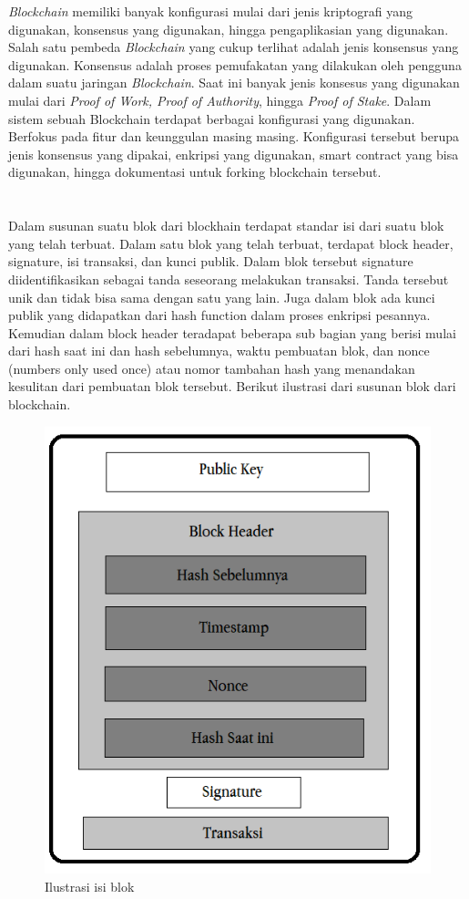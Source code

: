 \emph{Blockchain} memiliki banyak konfigurasi mulai dari jenis kriptografi yang digunakan, konsensus yang digunakan, hingga pengaplikasian yang digunakan. Salah satu pembeda \emph{Blockchain} yang cukup terlihat adalah jenis konsensus yang digunakan. Konsensus adalah proses pemufakatan yang dilakukan oleh pengguna dalam suatu jaringan \emph{Blockchain}. Saat ini banyak jenis konsesus yang digunakan mulai dari \emph{Proof of Work, Proof of Authority}, hingga \emph{Proof of Stake}. Dalam sistem sebuah Blockchain terdapat berbagai konfigurasi yang digunakan. Berfokus pada fitur dan keunggulan masing masing. Konfigurasi tersebut berupa jenis konsensus yang dipakai, enkripsi yang digunakan, smart contract yang bisa digunakan, hingga dokumentasi untuk forking blockchain tersebut.
\\ \\ \\
Dalam susunan suatu blok dari blockhain terdapat standar isi dari suatu blok yang telah terbuat. Dalam satu blok yang telah terbuat, terdapat block header, signature, isi transaksi, dan kunci publik. Dalam blok tersebut signature diidentifikasikan sebagai tanda seseorang melakukan transaksi. Tanda tersebut unik dan tidak bisa sama dengan satu yang lain. Juga dalam blok ada kunci publik yang didapatkan dari hash function dalam proses enkripsi pesannya. Kemudian dalam block header teradapat beberapa sub bagian yang berisi mulai dari hash saat ini dan hash sebelumnya, waktu pembuatan blok, dan nonce (numbers only used once) atau nomor tambahan hash yang menandakan kesulitan dari pembuatan blok tersebut. Berikut ilustrasi dari susunan blok dari blockchain.

\begin{figure}[htp]
  \centering
  \includegraphics[scale=0.6]{gambar/isi-blok.png}
  \caption{Ilustrasi isi blok}
  \label{fig:isiblok}
\end{figure}

